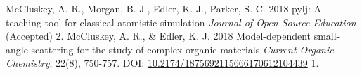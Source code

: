 \begin{cvpubys}
  \cvpuby
	{McCluskey, A. R., Morgan, B. J., Edler, K. J., Parker, S. C.}
	{2018}
	{pylj: A teaching tool for classical atomistic simulation}
	{\emph{Journal of Open-Source Education} (Accepted)}
	{2.}
  \cvpuby
    {McCluskey, A. R., \& Edler, K. J.}
    {2018}
    {Model-dependent small-angle scattering for the study of complex organic materials}
	{\emph{Current Organic Chemistry}, 22(8), 750-757. DOI: \href{http://doi.org/10.2174/1875692115666170612104439}{10.2174/1875692115666170612104439}}
    {1.}
\end{cvpubys}
